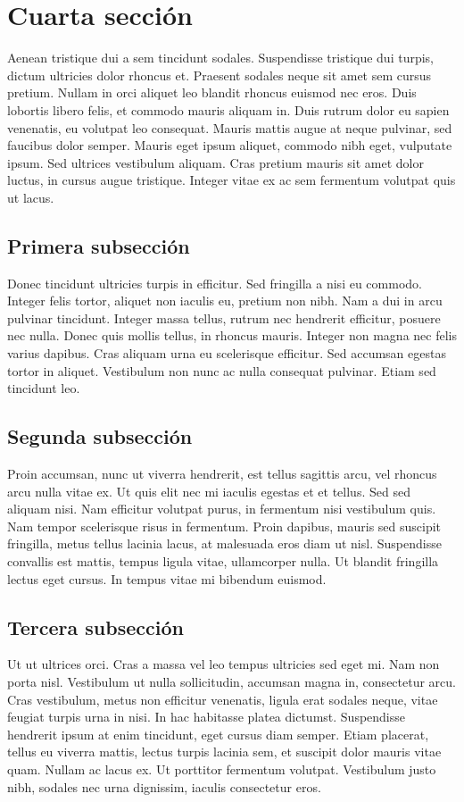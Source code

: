 \section{Cuarta sección}
Aenean tristique dui a sem tincidunt sodales. Suspendisse tristique dui turpis, dictum ultricies dolor rhoncus et. Praesent sodales neque sit amet sem cursus pretium. Nullam in orci aliquet leo blandit rhoncus euismod nec eros. Duis lobortis libero felis, et commodo mauris aliquam in. Duis rutrum dolor eu sapien venenatis, eu volutpat leo consequat. Mauris mattis augue at neque pulvinar, sed faucibus dolor semper. Mauris eget ipsum aliquet, commodo nibh eget, vulputate ipsum. Sed ultrices vestibulum aliquam. Cras pretium mauris sit amet dolor luctus, in cursus augue tristique. Integer vitae ex ac sem fermentum volutpat quis ut lacus.

\subsection{Primera subsección}
Donec tincidunt ultricies turpis in efficitur. Sed fringilla a nisi eu commodo. Integer felis tortor, aliquet non iaculis eu, pretium non nibh. Nam a dui in arcu pulvinar tincidunt. Integer massa tellus, rutrum nec hendrerit efficitur, posuere nec nulla. Donec quis mollis tellus, in rhoncus mauris. Integer non magna nec felis varius dapibus. Cras aliquam urna eu scelerisque efficitur. Sed accumsan egestas tortor in aliquet. Vestibulum non nunc ac nulla consequat pulvinar. Etiam sed tincidunt leo.

\subsection{Segunda subsección}
Proin accumsan, nunc ut viverra hendrerit, est tellus sagittis arcu, vel rhoncus arcu nulla vitae ex. Ut quis elit nec mi iaculis egestas et et tellus. Sed sed aliquam nisi. Nam efficitur volutpat purus, in fermentum nisi vestibulum quis. Nam tempor scelerisque risus in fermentum. Proin dapibus, mauris sed suscipit fringilla, metus tellus lacinia lacus, at malesuada eros diam ut nisl. Suspendisse convallis est mattis, tempus ligula vitae, ullamcorper nulla. Ut blandit fringilla lectus eget cursus. In tempus vitae mi bibendum euismod.

\subsection{Tercera subsección}
Ut ut ultrices orci. Cras a massa vel leo tempus ultricies sed eget mi. Nam non porta nisl. Vestibulum ut nulla sollicitudin, accumsan magna in, consectetur arcu. Cras vestibulum, metus non efficitur venenatis, ligula erat sodales neque, vitae feugiat turpis urna in nisi. In hac habitasse platea dictumst. Suspendisse hendrerit ipsum at enim tincidunt, eget cursus diam semper. Etiam placerat, tellus eu viverra mattis, lectus turpis lacinia sem, et suscipit dolor mauris vitae quam. Nullam ac lacus ex. Ut porttitor fermentum volutpat. Vestibulum justo nibh, sodales nec urna dignissim, iaculis consectetur eros.

